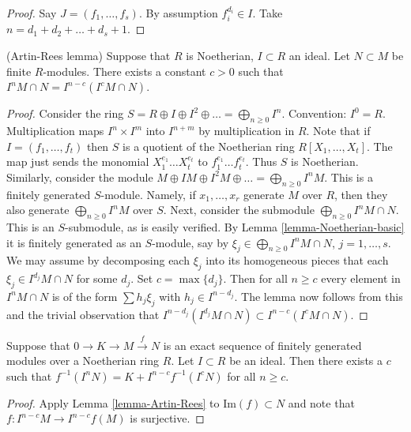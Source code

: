 \begin{proof}
Say $J = (f_1, \ldots, f_s)$.
By assumption $f_i^{d_i} \in I$.
Take $n = d_1 + d_2 + \ldots + d_s + 1$.
\end{proof}

\begin{lemma}
\label{lemma-Artin-Rees}
(Artin-Rees lemma)
Suppose that $R$ is Noetherian, $I \subset R$ an ideal.
Let $N \subset M$ be finite $R$-modules.
There exists a constant $c > 0$ such that
$I^n M \cap N  =  I^{n-c}(I^cM \cap N)$.
\end{lemma}

\begin{proof}
Consider the ring $S = R \oplus I \oplus I^2 \oplus \ldots
= \bigoplus_{n \geq 0} I^n$. Convention: $I^0 = R$.
Multiplication maps $I^n \times I^m$
into $I^{n + m}$ by multiplication in $R$.
Note that if $I = (f_1, \ldots, f_t)$
then $S$ is a quotient of the Noetherian ring $R[X_1, \ldots, X_t]$.
The map just sends the monomial $X_1^{e_1}\ldots X_t^{e_t}$
to $f_1^{e_1}\ldots f_t^{e_t}$. Thus $S$ is Noetherian.
Similarly, consider the module $M \oplus IM \oplus I^2M \oplus \ldots
= \bigoplus_{n \geq 0} I^nM$. This is a finitely generated $S$-module.
Namely, if $x_1, \ldots, x_r$ generate $M$ over $R$, then they also generate
$\bigoplus_{n \geq 0} I^nM$ over $S$. Next, consider the
submodule $\bigoplus_{n \geq 0} I^nM \cap N$.
This is an $S$-submodule, as is easily verified. By
Lemma \ref{lemma-Noetherian-basic} it is finitely generated as
an $S$-module,
say by $\xi_j \in \bigoplus_{n \geq 0} I^nM \cap N$, $j = 1, \ldots, s$.
We may assume by decomposing each $\xi_j$ into its homogeneous
pieces that each $\xi_j \in I^{d_j}M \cap N$ for some $d_j$.
Set $c = \max\{d_j\}$. Then for all $n \geq c$ every element
in $I^nM \cap N$ is of the form $\sum h_j \xi_j$ with
$h_j \in I^{n - d_j}$. The lemma now follows from this and the trivial
observation that $I^{n-d_j}(I^{d_j}M \cap N) \subset I^{n-c}(I^cM \cap N)$.
\end{proof}

\begin{lemma}
\label{lemma-map-AR}
Suppose that $0 \to K \to M \xrightarrow{f} N$ is an
exact sequence of finitely generated modules
over a Noetherian ring $R$. Let $I \subset R$ be an ideal.
Then there exists a $c$ such that $f^{-1}(I^nN)
= K + I^{n-c}f^{-1}(I^cN)$ for all $n \geq c$.
\end{lemma}

\begin{proof}
Apply Lemma \ref{lemma-Artin-Rees} to
$\text{Im}(f) \subset N$ and note that
$f : I^{n-c}M \to I^{n-c}f(M)$ is surjective.
\end{proof}

